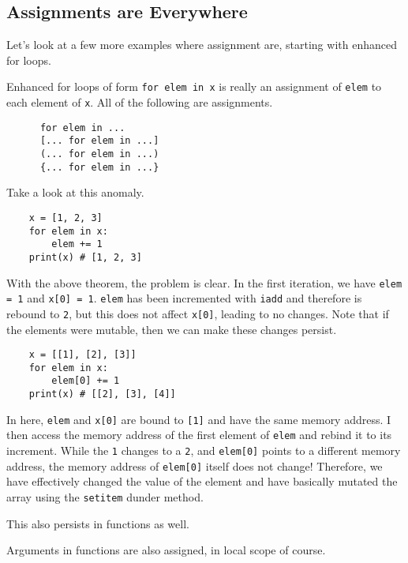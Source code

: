 \subsection{Assignments are Everywhere}

  Let's look at a few more examples where assignment are, starting with enhanced for loops. 

  \begin{theorem}
    Enhanced for loops of form \texttt{for elem in x} is really an assignment of \texttt{elem} to each element of \texttt{x}. All of the following are assignments. 
    \begin{lstlisting}
      for elem in ... 
      [... for elem in ...]
      (... for elem in ...)
      {... for elem in ...}
    \end{lstlisting}
  \end{theorem}

  Take a look at this anomaly. 
  \begin{lstlisting}
    x = [1, 2, 3] 
    for elem in x: 
        elem += 1 
    print(x) # [1, 2, 3]
  \end{lstlisting}
  With the above theorem, the problem is clear. In the first iteration, we have \texttt{elem = 1} and \texttt{x[0] = 1}. \texttt{elem} has been incremented with \texttt{iadd} and therefore is rebound to \texttt{2}, but this does not affect \texttt{x[0]}, leading to no changes. Note that if the elements were mutable, then we can make these changes persist. 
  \begin{lstlisting}
    x = [[1], [2], [3]]
    for elem in x: 
        elem[0] += 1 
    print(x) # [[2], [3], [4]]
  \end{lstlisting}
  In here, \texttt{elem} and \texttt{x[0]} are bound to \texttt{[1]} and have the same memory address. I then access the memory address of the first element of \texttt{elem} and rebind it to its increment. While the \texttt{1} changes to a \texttt{2}, and \texttt{elem[0]} points to a different memory address, the memory address of \texttt{elem[0]} itself does not change! Therefore, we have effectively changed the value of the element and have basically mutated the array using the \texttt{setitem} dunder method. 
  
  This also persists in functions as well. 

  \begin{theorem}
    Arguments in functions are also assigned, in local scope of course.  
  \end{theorem}

